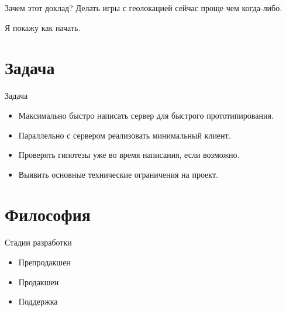 \documentclass[aspectratio=169,handout,bigger]{beamer}
\begin{document}

\begin{frame}{Зачем этот доклад?}
  Делать игры с геолокацией сейчас проще чем когда-либо.
  \vspace*{1em}\par
  Я покажу как начать.
\end{frame}


\section{Задача}


\begin{frame}{Задача}
  \begin{itemize}
    \item Максимально быстро написать сервер для быстрого прототипирования.
    \item Параллельно с сервером реализовать минимальный клиент.
    \item Проверять гипотезы уже во время написания, если возможно.
    \item Выявить основные технические ограничения на проект.
  \end{itemize}
\end{frame}


\section{Философия}


\begin{frame}{Стадии разработки}
  \begin{itemize}
    \item Препродакшен
    \item Продакшен
    \item Поддержка
  \end{itemize}
\end{frame}

\end{document}
